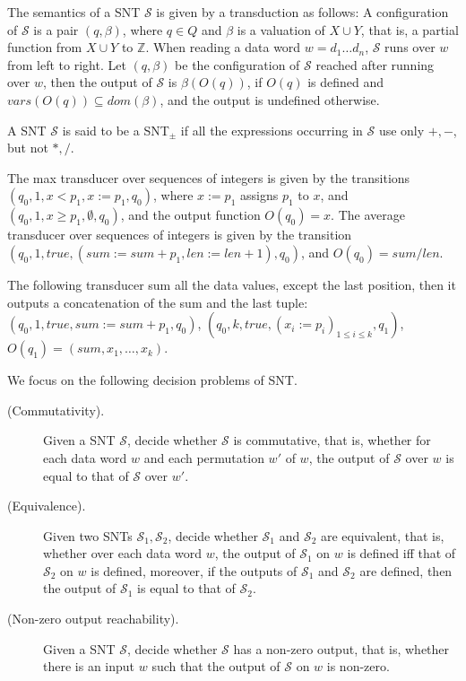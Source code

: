 \documentclass[runningheads,a4paper]{llncs}
\def\Ss{{\mathcal{S} }}
\def\Ii{{\mathbb{Z} }}
\begin{document}
The semantics of a SNT $\Ss$  is given by a transduction as follows: A configuration of $\Ss$ is a pair $(q,\beta)$, where $q \in Q$ and $\beta$ is a valuation of $X \cup Y$, that is, a partial function from $X \cup Y$ to $\Ii$. When reading a data word $w=d_1 \dots d_n$, $\Ss$ runs over $w$ from left to right. Let $(q, \beta)$ be the configuration of $\Ss$ reached after running over $w$, then the output of $\Ss$ is $\beta(O(q))$, if $O(q)$ is defined and $vars(O(q)) \subseteq dom(\beta)$, and the output is undefined otherwise.

A SNT $\Ss$ is said to be a SNT$_\pm$ if all the expressions occurring in $\Ss$ use only $+,-$, but not $\ast,/$.

\begin{example}
The max transducer over sequences of integers is given by the transitions $(q_0, 1, x < p_1, x:=p_1, q_0)$, where $x:= p_1$ assigns $p_1$ to $x$, and $(q_0, 1, x \ge p_1 , \emptyset, q_0)$, and the output function $O(q_0)=x$. The average transducer over sequences of integers is given by the transition $(q_0, 1, true, (sum:=sum + p_1, len := len +1), q_0)$, and $O(q_0)=sum / len$. 
\end{example}

\begin{example}
The following transducer sum all the data values, except the last position, then it outputs a concatenation of the sum and the last tuple: $(q_0, 1, true, sum:= sum + p_1, q_0)$, $(q_0, k, true, (x_i:=p_i)_{1 \le i \le k}, q_1)$, $O(q_1)=(sum, x_1,\dots, x_k)$.
\end{example}

We focus on the following decision problems of SNT.
\begin{description}
\item[(Commutativity).] Given a SNT $\Ss$, decide whether $\Ss$ is commutative, that is, whether for each data word $w$ and each permutation $w'$ of $w$, the output of $\Ss$ over $w$ is equal to that of $\Ss$ over $w'$.
%
\item[(Equivalence).] Given two SNTs $\Ss_1,\Ss_2$, decide whether $\Ss_1$ and $\Ss_2$ are equivalent, that is, whether over each data word $w$, the output of $\Ss_1$ on $w$ is defined iff that of $\Ss_2$ on $w$ is defined, moreover, if the outputs of $\Ss_1$ and $\Ss_2$ are defined, then the output of $\Ss_1$ is equal to that of $\Ss_2$.
%
\item[(Non-zero output reachability).] Given a SNT $\Ss$, decide whether $\Ss$ has a non-zero output, that is, whether there is an input $w$ such that the output of $\Ss$ on $w$ is non-zero. 
\end{description}
\end{document}
